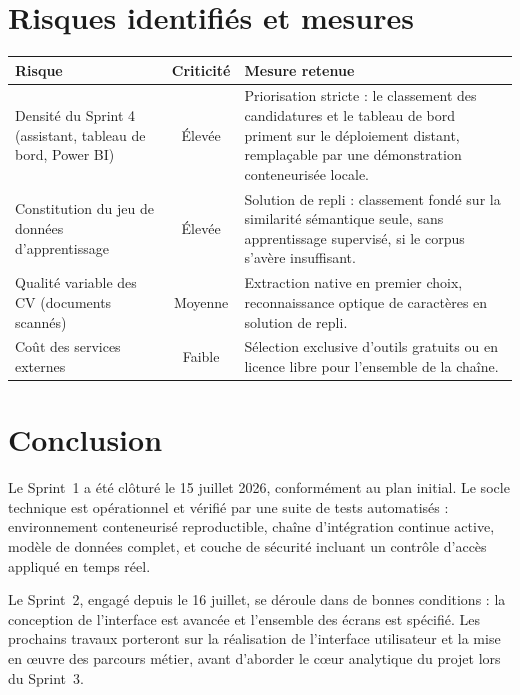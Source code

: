 \documentclass[11pt,a4paper]{article}
\begin{document}
\section{Risques identifiés et mesures}

\begin{center}
\begin{tabular}{p{4.6cm}cp{7.4cm}}
  \toprule
  \textbf{Risque} & \textbf{Criticité} & \textbf{Mesure retenue} \\
  \midrule
  Densité du Sprint 4 (assistant, tableau de bord, Power BI) & Élevée & Priorisation stricte : le classement des candidatures et le tableau de bord priment sur le déploiement distant, remplaçable par une démonstration conteneurisée locale. \\[1mm]
  Constitution du jeu de données d'apprentissage & Élevée & Solution de repli : classement fondé sur la similarité sémantique seule, sans apprentissage supervisé, si le corpus s'avère insuffisant. \\[1mm]
  Qualité variable des CV (documents scannés) & Moyenne & Extraction native en premier choix, reconnaissance optique de caractères en solution de repli. \\[1mm]
  Coût des services externes & Faible & Sélection exclusive d'outils gratuits ou en licence libre pour l'ensemble de la chaîne. \\
  \bottomrule
\end{tabular}
\end{center}

\section{Conclusion}
Le Sprint~1 a été clôturé le 15 juillet 2026, conformément au plan initial. Le socle technique est opérationnel et vérifié par une suite de tests automatisés : environnement conteneurisé reproductible, chaîne d'intégration continue active, modèle de données complet, et couche de sécurité incluant un contrôle d'accès appliqué en temps réel.

Le Sprint~2, engagé depuis le 16 juillet, se déroule dans de bonnes conditions : la conception de l'interface est avancée et l'ensemble des écrans est spécifié. Les prochains travaux porteront sur la réalisation de l'interface utilisateur et la mise en œuvre des parcours métier, avant d'aborder le cœur analytique du projet lors du Sprint~3.
\end{document}
